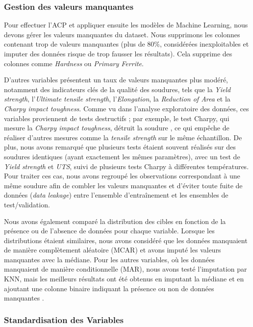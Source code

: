 \documentclass{article}
\newcommand{\bcite}[1]{\textbf{\cite{#1}}}
\begin{document}
\subsubsection{Gestion des valeurs manquantes}

Pour effectuer l'ACP et appliquer ensuite les modèles de Machine Learning, nous devons gérer les valeurs manquantes du dataset.
Nous supprimons les colonnes contenant trop de valeurs manquantes (plus de 80\%, considérées inexploitables et imputer des données risque de trop fausser les résultats). Cela supprime des colonnes comme \textit{Hardness} ou \textit{Primary Ferrite}.

D'autres variables présentent un taux de valeurs manquantes plus modéré, notamment des indicateurs clés de la qualité des soudures, tels que la \textit{Yield strength}, l'\textit{Ultimate tensile strength}, l'\textit{Elongation}, la \textit{Reduction of Area} et la \textit{Charpy impact toughness}. Comme vu dans l'analyse exploratoire des données, ces variables proviennent de tests destructifs ; par exemple, le test Charpy, qui mesure la \textit{Charpy impact toughness}, détruit la soudure \bcite{charpy,science-direct}, ce qui empêche de réaliser d'autres mesures comme la \textit{tensile strength} sur le même échantillon. De plus, nous avons remarqué que plusieurs tests étaient souvent réalisés sur des soudures identiques (ayant exactement les mêmes paramètres), avec un test de \textit{Yield strength} et \textit{UTS}, suivi de plusieurs tests Charpy à différentes températures. Pour traiter ces cas, nous avons regroupé les observations correspondant à une même soudure afin de combler les valeurs manquantes et d'éviter toute fuite de données (\textit{data leakage}) entre l'ensemble d'entraînement et les ensembles de test/validation.

Nous avons également comparé la distribution des cibles en fonction de la présence ou de l'absence de données pour chaque variable. Lorsque les distributions étaient similaires, nous avons considéré que les données manquaient de manière complètement aléatoire (MCAR) et avons imputé les valeurs manquantes avec la médiane. Pour les autres variables, où les données manquaient de manière conditionnelle (MAR), nous avons testé l'imputation par KNN, mais les meilleurs résultats ont été obtenus en imputant la médiane et en ajoutant une colonne binaire indiquant la présence ou non de données manquantes \bcite{medium}.

\subsubsection{Standardisation des Variables}
\end{document}
